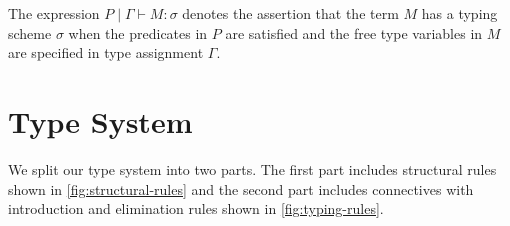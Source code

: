 \begin{defn}
The expression $P \mid \Gamma \vdash M : \sigma$ denotes the assertion that the term $M$ has a typing scheme $\sigma$
when the predicates in $P$ are satisfied and the free type variables in $M$ are specified in type assignment $\Gamma$.
\end{defn}

\section{Type System}\label{sec:type-system}
We split our type system into two parts. The first part includes structural rules
shown in \cref{fig:structural-rules} and the second part includes connectives with
introduction and elimination rules shown in \cref{fig:typing-rules}.

